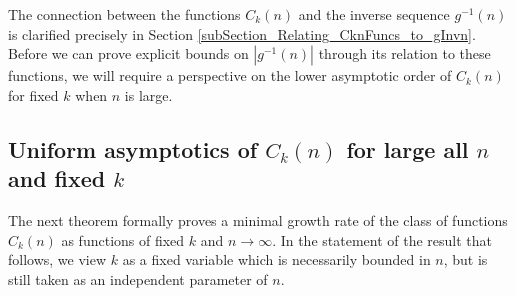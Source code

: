 \documentclass[11pt,reqno,a4letter]{article}
\numberwithin{figure}{section}
\numberwithin{table}{section}
\theoremstyle{plain}
\numberwithin{theorem}{section}
\theoremstyle{definition}
\begin{document}
The connection between the functions $C_k(n)$ and the inverse sequence $g^{-1}(n)$ is 
clarified precisely in Section \ref{subSection_Relating_CknFuncs_to_gInvn}. Before we can prove explicit 
bounds on $|g^{-1}(n)|$ through its relation to these functions, we will require a perspective 
on the lower asymptotic order of $C_k(n)$ for fixed $k$ when $n$ is large. 

\subsection{Uniform asymptotics of $C_k(n)$ for large all $n$ and fixed $k$} 

The next theorem formally proves a minimal growth rate of the class of functions 
$C_k(n)$ as functions of fixed $k$ and $n \rightarrow \infty$. 
In the statement of the result that follows, we view $k$ as a fixed variable which is 
necessarily bounded in $n$, but is still taken as an independent parameter of $n$. 
\end{document}
